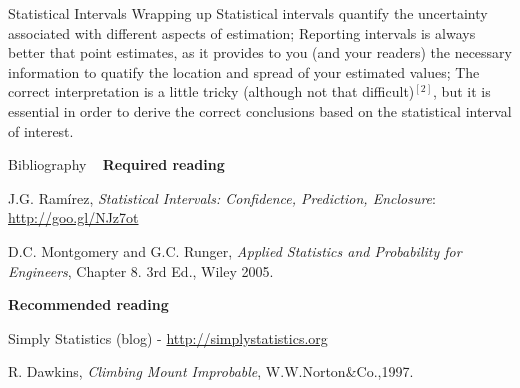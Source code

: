 \documentclass[t]{beamer}
\begin{document}

\begin{ftst}
{Statistical Intervals}
{Wrapping up}
Statistical intervals quantify the uncertainty associated with different aspects of estimation;
\vone
Reporting intervals is always better that point estimates, as it provides to you (and your readers) the necessary information to quatify the location and spread of your estimated values;
\vone
The correct interpretation is a little tricky (although not that difficult)$^{[2]}$, but it is essential in order to derive the correct conclusions based on the statistical interval of interest.
\end{ftst}



\begin{ftst}
{Bibliography}
{\ }
\scriptsize
\textbf{Required reading}

\benums J.G. Ram\'irez, \textit{Statistical Intervals: Confidence, Prediction, Enclosure}: \url{http://goo.gl/NJz7ot}
\item D.C. Montgomery and G.C. Runger, \textit{Applied Statistics and Probability for Engineers}, Chapter 8. 3rd Ed., Wiley 2005.
\eenum

\textbf{Recommended reading}

\benums Simply Statistics (blog) - \url{http://simplystatistics.org}
\item R. Dawkins, \textit{Climbing Mount Improbable}, W.W.Norton\&Co.,1997.
\eenum
\end{ftst}

\end{document}
